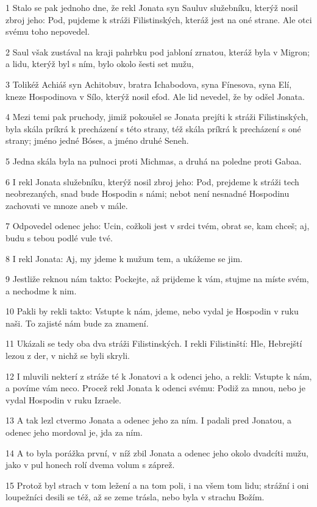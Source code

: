\par 1 Stalo se pak jednoho dne, že rekl Jonata syn Sauluv služebníku, kterýž nosil zbroj jeho: Pod, pujdeme k stráži Filistinských, kteráž jest na oné strane. Ale otci svému toho nepovedel.
\par 2 Saul však zustával na kraji pahrbku pod jabloní zrnatou, kteráž byla v Migron; a lidu, kterýž byl s ním, bylo okolo šesti set mužu,
\par 3 Tolikéž Achiáš syn Achitobuv, bratra Ichabodova, syna Fínesova, syna Elí, kneze Hospodinova v Sílo, kterýž nosil efod. Ale lid nevedel, že by odšel Jonata.
\par 4 Mezi temi pak pruchody, jimiž pokoušel se Jonata prejíti k stráži Filistinských, byla skála príkrá k precházení s této strany, též skála príkrá k precházení s oné strany; jméno jedné Bóses, a jméno druhé Seneh.
\par 5 Jedna skála byla na pulnoci proti Michmas, a druhá na poledne proti Gabaa.
\par 6 I rekl Jonata služebníku, kterýž nosil zbroj jeho: Pod, prejdeme k stráži tech neobrezaných, snad bude Hospodin s námi; nebot není nesnadné Hospodinu zachovati ve mnoze aneb v mále.
\par 7 Odpovedel odenec jeho: Ucin, cožkoli jest v srdci tvém, obrat se, kam chceš; aj, budu s tebou podlé vule tvé.
\par 8 I rekl Jonata: Aj, my jdeme k mužum tem, a ukážeme se jim.
\par 9 Jestliže reknou nám takto: Pockejte, až prijdeme k vám, stujme na míste svém, a nechodme k nim.
\par 10 Pakli by rekli takto: Vstupte k nám, jdeme, nebo vydal je Hospodin v ruku naši. To zajisté nám bude za znamení.
\par 11 Ukázali se tedy oba dva stráži Filistinských. I rekli Filistinští: Hle, Hebrejští lezou z der, v nichž se byli skryli.
\par 12 I mluvili nekterí z stráže té k Jonatovi a k odenci jeho, a rekli: Vstupte k nám, a povíme vám neco. Procež rekl Jonata k odenci svému: Podiž za mnou, nebo je vydal Hospodin v ruku Izraele.
\par 13 A tak lezl ctvermo Jonata a odenec jeho za ním. I padali pred Jonatou, a odenec jeho mordoval je, jda za ním.
\par 14 A to byla porážka první, v níž zbil Jonata a odenec jeho okolo dvadcíti mužu, jako v pul honech rolí dvema volum s záprež.
\par 15 Protož byl strach v tom ležení a na tom poli, i na všem tom lidu; strážní i oni loupežníci desili se též, až se zeme trásla, nebo byla v strachu Božím.
